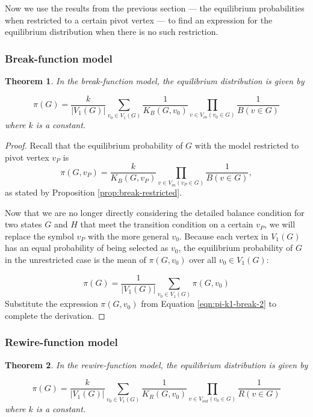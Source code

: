 \documentclass[a4paper,10pt]{article}
\newtheorem{theorem}{Theorem}
\begin{document}
Now we use the results from the previous section --- the equilibrium probabilities when restricted to a certain pivot vertex --- to find an expression for the equilibrium distribution when there is no such restriction.

\subsubsection{Break-function model}
\begin{theorem} 
In the break-function model, the equilibrium distribution is given by 

 \begin{equation}
 \label{eqn:pi-break}
  \pi(G) = \frac{k}{|V_1(G)|} \sum\limits_{v_0 \in V_1(G)} 
\frac{1}{K_B(G, v_0)} 
 \prod \limits_{v \in V_{in}(v_0 \in G)} \frac{1}{B(v \in G)}
 \end{equation}
where $k$ is a constant.
\end{theorem}

\begin{proof}
Recall that the equilibrium probability of $G$ with the model restricted to pivot vertex $v_P$ is
 \begin{equation}
 \label{eqn:pi-k1-break-2}
  \pi(G, v_P) = \frac{k}{K_B(G, v_P)} 
 \prod \limits_{v \in V_{in}(v_P \in G)} \frac{1}{B(v \in G)},
 \end{equation}
as stated by Proposition \ref{prop:break-restricted}.

Now that we are no longer directly considering the detailed balance condition for two states $G$ and $H$ that meet the transition condition on a certain $v_P$, we will replace the symbol $v_P$ with the more general $v_0$. Because each vertex in $V_1(G)$ has an equal probability of being selected as $v_0$, the equilibrium probability of $G$ in the unrestricted case is the mean of $\pi(G, v_0)$ over all $v_0 \in V_1(G)$:

\begin{equation}
   \pi(G) = \frac{1}{|V_1(G)|} \sum\limits_{v_0 \in V_1(G)} 
 \pi(G, v_0)
\end{equation}
Substitute the expression $\pi(G, v_0)$ from Equation \ref{eqn:pi-k1-break-2} to complete the derivation.

\end{proof}

\subsubsection{Rewire-function model}
\begin{theorem} 
In the rewire-function model, the equilibrium distribution is given by 

 \begin{equation}
 \label{eqn:pi-rewire}
  \pi(G) = \frac{k}{|V_1(G)|} \sum\limits_{v_0 \in V_1(G)} 
\frac{1}{K_R(G, v_0)} 
 \prod \limits_{v \in V_{out}(v_0 \in G)} \frac{1}{R(v \in G)}
 \end{equation}
where $k$ is a constant.
\end{theorem}
\end{document}
